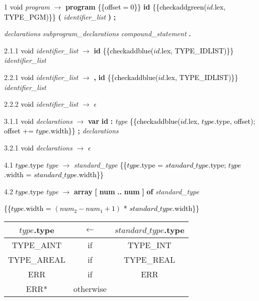 
 1    \textcolor{black}{void} \emph{program} $\rightarrow$ \textbf{program} \textcolor{black}{\{\{offset$ = 0$\}\}} \textbf{id} \textcolor{black}{\{\{checkaddgreen($id$.lex, TYPE\_PGM)\}\}} \textbf{(} \emph{identifier\_list} \textbf{)} \textbf{;}

 \emph{declarations} \emph{subprogram\_declarations}  \emph{compound\_statement} \textbf{.}


2.1.1  \textcolor{black}{void} \emph{identifier\_list} $\rightarrow$ \textbf{id} \textcolor{black}{\{\{checkaddblue($id$.lex, TYPE\_IDLIST)\}\}} \emph{identifier\_list\textprime}

2.2.1  \textcolor{black}{void} \emph{identifier\_list\textprime} $\rightarrow$ \textbf{,} \textbf{id} \textcolor{black}{\{\{checkaddblue($id$.lex, TYPE\_IDLIST)\}\}} \emph{identifier\_list\textprime}

2.2.2  \textcolor{black}{void} \emph{identifier\_list\textprime} $\rightarrow$ $\epsilon$

3.1.1  \textcolor{black}{void} \emph{declarations} $\rightarrow$ \textbf{var} \textbf{id} \textbf{:} \emph{type} \textcolor{black}{\{\{checkaddblue($id$.lex, $type$.type, offset); offset += $type$.width\}\}} \textbf{;} \emph{declarations}

3.2.1 \textcolor{black}{void} \emph{declarations} $\rightarrow$ $\epsilon$

4.1  \textcolor{black}{$type$.type} \emph{type} $\rightarrow$ \emph{standard\_type} \textcolor{black}{\{\{$type$.type = $standard\_type$.type; $type$.width = $standard\_type$.width\}\}}

4.2  \textcolor{black}{$type$.type} \emph{type} $\rightarrow$ \textbf{array} \textbf{[} \textbf{num} \textbf{..} \textbf{num} \textbf{]} \textbf{of} \emph{standard\_type}

\textcolor{black}{\{\{$type$.width = $(num_2 - num_1 + 1)$ * $standard\_type$.width\}\}}

\begin{tabular}[t]{|ccc|}

  \hline

  $type$.type & \textbf{$\leftarrow$} & $standard\_type$.type \\

  \hline
                                                                                                                                              TYPE\_AINT & if & TYPE\_INT\\
  TYPE\_AREAL & if & TYPE\_REAL \\

  ERR & if & ERR \\

  ERR* & otherwise & \\

  \hline

                                                                                                                                            \end{tabular}



